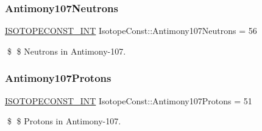 \subsubsection{\texorpdfstring{Antimony107\+Neutrons}{Antimony107Neutrons}}
{\footnotesize\ttfamily \mbox{\hyperlink{group___isotope_const-_macros_ga5f18360b3e99483a35c32d789e62621c}{I\+S\+O\+T\+O\+P\+E\+C\+O\+N\+S\+T\+\_\+\+I\+NT}} Isotope\+Const\+::\+Antimony107\+Neutrons = 56}

\$ \$ Neutrons in Antimony-\/107. \mbox{\label{group___isotope_const-_antimony-_sb107_ga0d627ce60f57eb21f924ee52b7df4ca9}} 
\subsubsection{\texorpdfstring{Antimony107\+Protons}{Antimony107Protons}}
{\footnotesize\ttfamily \mbox{\hyperlink{group___isotope_const-_macros_ga5f18360b3e99483a35c32d789e62621c}{I\+S\+O\+T\+O\+P\+E\+C\+O\+N\+S\+T\+\_\+\+I\+NT}} Isotope\+Const\+::\+Antimony107\+Protons = 51}

\$ \$ Protons in Antimony-\/107. 